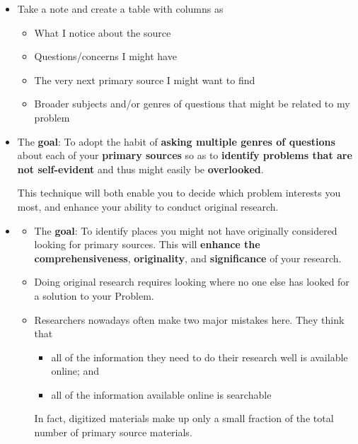 \documentclass[11pt]{article}
\begin{document}
\begin{itemize}
\item Take a note and create a table with columns as
\begin{itemize}
\item What I notice about the source 
\item Questions/concerns I might have
\item The very next primary source I might want to find
\item Broader subjects and/or genres of questions that might be related to my problem
\end{itemize}

\item  \begin{exercise}

The \textbf{goal}: To adopt the habit of \textbf{asking multiple genres of questions} about each of your \textbf{primary sources} so as to \textbf{identify problems that are not self-evident} and thus might easily be \textbf{overlooked}. 

This technique will both enable you to decide which problem interests you most, and enhance your ability to conduct original research.
\end{exercise}

\item \begin{exercise}
\begin{itemize}
\item The \textbf{goal}: To identify places you might not have originally considered looking for primary sources. This will \textbf{enhance the comprehensiveness}, \textbf{originality}, and \textbf{significance} of your research.

\item Doing original research requires looking where no one else has looked for a solution to your Problem.

\item Researchers nowadays often make two major mistakes here. They think that
\begin{itemize}
\item all of the information they need to do their research well is available online; and
\item all of the information available online is searchable
\end{itemize} In fact, digitized materials make up only a small fraction of the total number of primary source materials. 


\end{itemize}
\end{exercise}
\end{itemize}
\end{document}
